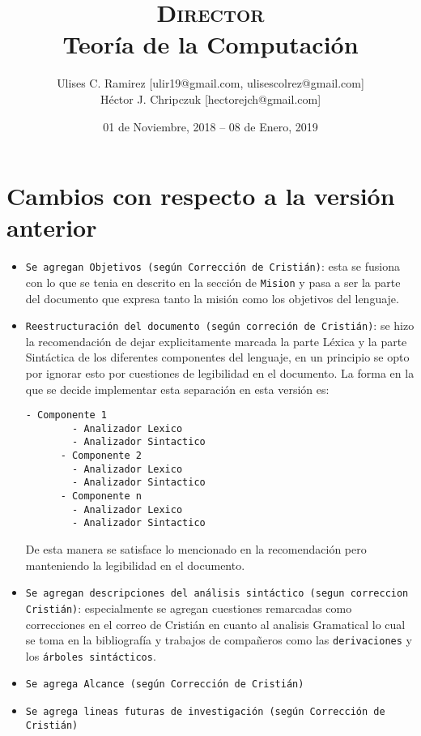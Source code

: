 \documentclass{report}
\title{\textsc{Director}\\Teoría de la Computación}
\author{Ulises C. Ramirez [ulir19@gmail.com, ulisescolrez@gmail.com]\\Héctor J.
Chripczuk [hectorejch@gmail.com]}
\date{01 de Noviembre, 2018 -- 08 de Enero, 2019}
\begin{document}
\maketitle
{}
\newpage

\section*{Cambios con respecto a la versión anterior}

\begin{itemize}
  \item \texttt{Se agregan Objetivos (según Corrección de Cristián)}: esta se fusiona con lo que se tenia en
    descrito en la sección de \texttt{Mision} y pasa a ser la parte del documento
    que expresa tanto la misión como los objetivos del lenguaje.
  \item \texttt{Reestructuración del documento (según correción de Cristián)}:
    se hizo la recomendación de dejar explicitamente marcada la parte Léxica y
    la parte Sintáctica de los diferentes componentes del lenguaje, en un
    principio se opto por ignorar esto por cuestiones de legibilidad en el
    documento.
    La forma en la que se decide implementar esta separación en esta versión
    es:
    \begin{lstlisting}[basicstyle=\footnotesize]
      - Componente 1
        - Analizador Lexico
        - Analizador Sintactico
      - Componente 2
        - Analizador Lexico
        - Analizador Sintactico
      - Componente n
        - Analizador Lexico
        - Analizador Sintactico
    \end{lstlisting}

    De esta manera se satisface lo mencionado en la recomendación pero
    manteniendo la legibilidad en el documento.
  \item \texttt{Se agregan descripciones del análisis sintáctico (segun
    correccion Cristián)}:
    especialmente se agregan cuestiones remarcadas como correcciones en el
    correo de Cristián en cuanto al analisis Gramatical lo cual se toma en la
    bibliografía y trabajos de compañeros como las \texttt{derivaciones} y los
    \texttt{árboles sintácticos}.
  \item \texttt{Se agrega Alcance (según Corrección de Cristián)}
  \item \texttt{Se agrega lineas futuras de investigación (según Corrección de Cristián)}
\end{itemize}
\end{document}
